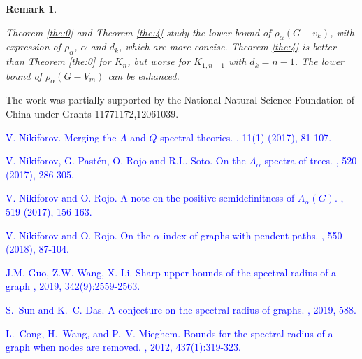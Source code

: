 \documentclass[amsthm]{elsart}
\newtheorem{remark}{Remark}[section]
\begin{document}
\begin{remark} \label{remark:2}

Theorem \ref{the:0} and Theorem \ref{the:4} study the lower bound of $\rho_\alpha(G-v_k)$, with expression of $\rho_\alpha$, $\alpha$ and $d_k$, which are more concise. Theorem \ref{the:4} is better than Theorem \ref{the:0} for $K_n$, but worse for $K_{1,n-1}$ with $d_k= n-1$. The lower bound of $\rho_\alpha(G-V_m)$ can be enhanced.
\end{remark}

\vskip4mm


 The work was partially supported by the National Natural Science Foundation of China under Grants 11771172,12061039.




\begin{thebibliography}{99}

\textcolor{blue}{
V. Nikiforov.
\newblock Merging the $A$-and $Q$-spectral theories.
, 11(1) (2017), 81-107.}

\textcolor{blue}{
V. Nikiforov, G. Past\'{e}n, O. Rojo and R.L. Soto.
\newblock On the $A_\alpha$-spectra of trees.
, 520 (2017), 286-305.}

\textcolor{blue}{
V. Nikiforov and O. Rojo.
\newblock A note on the positive semidefinitness of $A_\alpha(G)$.
, 519 (2017), 156-163.}

\textcolor{blue}{
V. Nikiforov and O. Rojo.
\newblock On the $\alpha$-index of graphs with pendent paths.
, 550 (2018), 87-104.}

\textcolor{blue}{
J.M. Guo, Z.W. Wang, X. Li.
\newblock Sharp upper bounds of the spectral radius of a graph
, 2019, 342(9):2559-2563.}

\textcolor{blue}{
S.~Sun and K.~C. Das.
\newblock A conjecture on the spectral radius of graphs.
, 2019, 588.}

\textcolor{blue}{
L.~Cong, H.~Wang, and P.~V. Mieghem.
\newblock Bounds for the spectral radius of a graph when nodes are removed.
, 2012, 437(1):319-323.}



\end{thebibliography}
\end{document}
